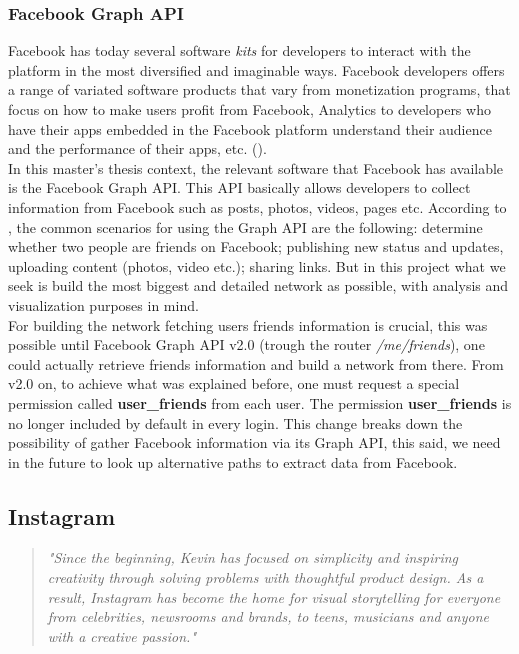 \subsubsection*{Facebook Graph API}
Facebook has today several software \textit{kits} for developers to interact with the platform in the most diversified and imaginable ways. Facebook developers
offers a range of variated software products that vary from monetization programs, that focus on how to make users profit from Facebook, Analytics to developers who
have their apps embedded in the Facebook platform understand their audience and the performance of their apps, etc. (\cite{fbproducts}).\\
\indent In this master's thesis context, the relevant software that Facebook has available is the Facebook Graph API. This API basically allows developers to collect information
from Facebook such as posts, photos, videos, pages etc. According to \cite{fbgapi}, the common scenarios for using the Graph API
are the following: determine whether two people are friends on Facebook; publishing new status and updates, uploading content (photos, video etc.); sharing links. But in this project what we seek is
build the most biggest and detailed network as possible, with analysis and visualization purposes in mind.\\
\indent For building the network fetching users friends information is crucial, this was possible until Facebook Graph API v2.0 (trough the router \textit{/me/friends}), one could actually retrieve
friends information and build a network from there. From v2.0 on, to achieve what was explained before, one must request a special permission called \textbf{user\_friends}
from each user. The permission \textbf{user\_friends} is no longer included by default in every login. This change breaks down the possibility of gather Facebook information via its Graph API,
this said, we need in the future to look up alternative paths to extract data from Facebook.


\subsection{Instagram}

\begin{quote}
\textit{"Since the beginning, Kevin has focused on simplicity and inspiring creativity through solving problems with thoughtful
product design. As a result, Instagram has become the home for visual storytelling for everyone from celebrities, newsrooms and
brands, to teens, musicians and anyone with a creative passion."} \cite{instabout}
\end{quote}

